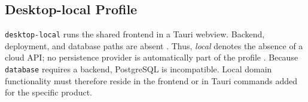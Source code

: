 \subsection{Desktop-local Profile}
\label{subsec:profil-desktop-local}

\texttt{desktop-local} runs the shared frontend in a Tauri webview. Backend,
deployment, and database paths are absent \parencite{kleiveist2026profiles}.
Thus, \emph{local} denotes the absence of a cloud API; no persistence provider
is automatically part of the profile \parencite{kleiveist2026persistence}.
Because \texttt{database} requires a backend, PostgreSQL is incompatible.
Local domain functionality must therefore reside in the frontend or in Tauri
commands added for the specific product.
